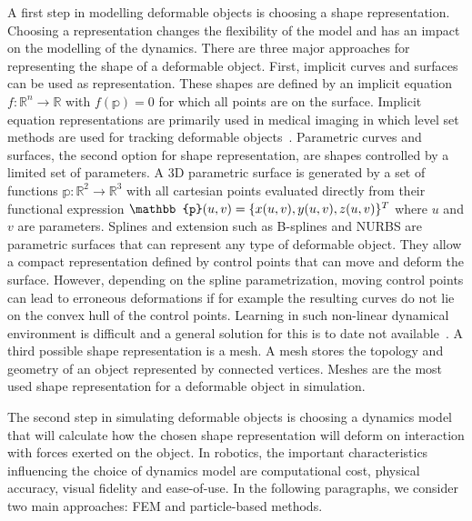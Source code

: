 \documentclass[\home/main.tex]{subfiles}
\begin{document}
A first step in modelling deformable objects is choosing a shape representation. Choosing a representation changes the flexibility of the model and has an impact on the modelling of the dynamics. There are three major approaches for representing the shape of a deformable object.  First, implicit curves and surfaces can be used as representation. These shapes are defined by an implicit equation $f: \mathbb{R}^{n} \rightarrow \mathbb{R}$ with $f(\mathbb{p}) = 0$ for which all points are on the surface. Implicit equation representations are primarily used in medical imaging in which level set methods are used for tracking deformable objects~\autocite{Cremers2006}. Parametric curves and surfaces, the second option for shape representation, are shapes controlled by a limited set of parameters. A 3D parametric surface is generated by a set of functions $\mathbb{p}: \mathbb{R}^{2} \rightarrow \mathbb{R}^{3}$ with all cartesian points evaluated directly from their functional expression $\mathbb{p}(u, v) =\\ \{x(u, v), y(u, v), z(u, v)\}^{T}$ where $u$ and $v$ are parameters. Splines and extension such as B-splines and NURBS are parametric surfaces that can represent any type of deformable object. They allow a compact representation defined by control points that can move and deform the surface. However, depending on the spline parametrization, moving control points can lead to erroneous deformations if for example the resulting curves do not lie on the convex hull of the control points. Learning in such non-linear dynamical environment is difficult and a general solution for this is to date not available~\autocite{rios2020}. A third possible shape representation is a mesh. A mesh stores the topology and geometry of an object represented by connected vertices. Meshes are the most used shape representation for a deformable object in simulation.

The second step in simulating deformable objects is choosing a dynamics model that will calculate how the chosen shape representation will deform on interaction with forces exerted on the object. In robotics, the important characteristics influencing the choice of dynamics model are computational cost, physical accuracy, visual fidelity and ease-of-use. In the following paragraphs, we consider two main approaches: \gls{FEM} and particle-based methods.
\end{document}
